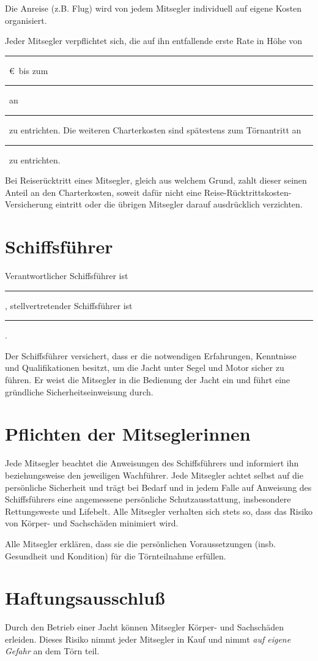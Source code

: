 \documentclass[a4paper,12pt]{article}
\newcommand{\openlength}[1]{\rule{#1}{.4pt}}
\newcommand{\openeuro}{\openlength{2cm}~\euro}
\newcommand{\open}{\openlength{3cm}}
\newcommand{\skipper}{\open}
\newcommand{\coskipper}{\open}
\newcommand{\paydate}{\open}
\begin{document}
Die Anreise (z.B. Flug) wird von jedem Mitsegler individuell auf eigene Kosten organisiert.

Jeder Mitsegler verpflichtet sich, die auf ihn entfallende erste Rate in Höhe von \openeuro\ bis zum \paydate\ an \skipper\ zu entrichten.
Die weiteren Charterkosten sind spätestens zum Törnantritt an \skipper\ zu entrichten.

Bei Reiserücktritt eines Mitsegler, gleich aus welchem Grund, zahlt dieser seinen Anteil an den Charterkosten, soweit dafür nicht eine Reise-Rücktrittskosten-Versicherung eintritt oder die übrigen Mitsegler darauf ausdrücklich verzichten.


\section{Schiffsführer}
\label{sec:Skipper}

Verantwortlicher Schiffsführer ist \skipper, stellvertretender Schiffsführer ist \coskipper.

Der Schiffsführer versichert, dass er die notwendigen Erfahrungen, Kenntnisse und Qualifikationen besitzt, um die Jacht unter Segel und Motor sicher zu führen.
Er weist die Mitsegler in die Bedienung der Jacht ein und führt eine gründliche Sicherheitseinweisung durch.


\section{Pflichten der Mitseglerinnen}
\label{sec:Pflichten}

Jede Mitsegler beachtet die Anweisungen des Schiffsführers und informiert ihn beziehungsweise den jeweiligen Wachführer.
Jede Mitsegler achtet selbst auf die persönliche Sicherheit und trägt bei Bedarf und in jedem Falle auf Anweisung des Schiffsführers eine angemessene persönliche Schutzausstattung, insbesondere Rettungsweste und Lifebelt.
Alle Mitsegler verhalten sich stets so, dass das Risiko von Körper- und Sachschäden minimiert wird.

Alle Mitsegler erklären, dass sie die persönlichen Voraussetzungen (insb. Gesundheit und Kondition) für die Törnteilnahme erfüllen.


\section{Haftungsausschluß}
\label{sec:Haftung}

Durch den Betrieb einer Jacht können Mitsegler Körper- und Sachschäden erleiden.
Dieses Risiko nimmt jeder Mitsegler in Kauf und nimmt \textit{auf eigene Gefahr} an dem Törn teil.
\end{document}
